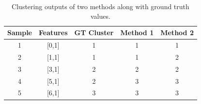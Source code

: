 \documentclass{article}
\begin{document}
\begin{table}[H]
    \centering
    \begin{tabular}{|c|c|c|c|c|}
        \hline
        Sample & Features & GT Cluster & Method 1 & Method 2 \\ \hline
        1 & [0,1]      & 1          & 1        & 1        \\ \hline
        2 & [1,1]      & 1          & 1        & 2        \\ \hline
        3 & [3,1]      & 2          & 2        & 2        \\ \hline
        4 & [5,1]      & 2          & 3        & 3        \\ \hline
        5 & [6,1]      & 3          & 3        & 3        \\ \hline
    \end{tabular}
    \caption{Clustering outputs of two methods along with ground truth values.}
\end{table}
\end{document}
